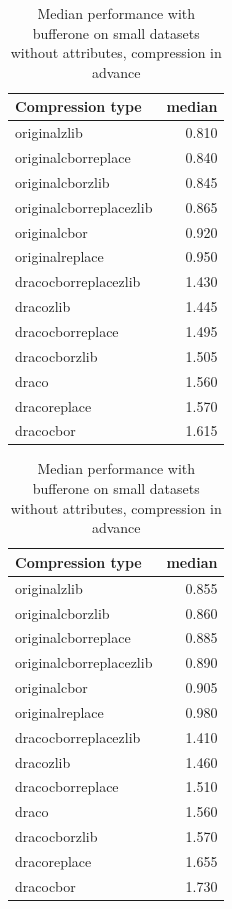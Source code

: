 \begin{table}[!h]
    \begin{minipage}{.5\linewidth}
      \caption{
Median performance with bufferone on small datasets, compression in advance}
\centering

\begin{tabular}{|l|r|}
\hline
Compression type & median\\
\hline
originalzlib & 0.810\\
\hline
originalcborreplace & 0.840\\
\hline
originalcborzlib & 0.845\\
\hline
originalcborreplacezlib & 0.865\\
\hline
originalcbor & 0.920\\
\hline
originalreplace & 0.950\\
\hline
dracocborreplacezlib & 1.430\\
\hline
dracozlib & 1.445\\
\hline
dracocborreplace & 1.495\\
\hline
dracocborzlib & 1.505\\
\hline
draco & 1.560\\
\hline
dracoreplace & 1.570\\
\hline
dracocbor & 1.615\\
\hline
\end{tabular}
\end{minipage}%
    \begin{minipage}{.5\linewidth}
      \centering
        \caption{
Median performance with bufferone on small datasets without attributes, compression in advance}

\begin{tabular}{|l|r|}
\hline
Compression type & median\\
\hline
originalzlib & 0.855\\
\hline
originalcborzlib & 0.860\\
\hline
originalcborreplace & 0.885\\
\hline
originalcborreplacezlib & 0.890\\
\hline
originalcbor & 0.905\\
\hline
originalreplace & 0.980\\
\hline
dracocborreplacezlib & 1.410\\
\hline
dracozlib & 1.460\\
\hline
dracocborreplace & 1.510\\
\hline
draco & 1.560\\
\hline
dracocborzlib & 1.570\\
\hline
dracoreplace & 1.655\\
\hline
dracocbor & 1.730\\
\hline
\end{tabular}
\end{minipage} 
\end{table}



